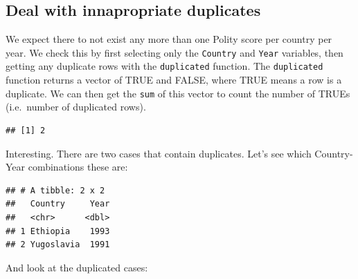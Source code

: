 \documentclass[]{book}
\newenvironment{Shaded}{\begin{snugshade}}{\end{snugshade}}
\newcommand{\DecValTok}[1]{\textcolor[rgb]{0.00,0.00,0.81}{#1}}
\newcommand{\KeywordTok}[1]{\textcolor[rgb]{0.13,0.29,0.53}{\textbf{#1}}}
\newcommand{\NormalTok}[1]{#1}
\newcommand{\OperatorTok}[1]{\textcolor[rgb]{0.81,0.36,0.00}{\textbf{#1}}}
\newcommand{\StringTok}[1]{\textcolor[rgb]{0.31,0.60,0.02}{#1}}
\begin{document}
\hypertarget{deal-with-innapropriate-duplicates}{%
\subsection{Deal with innapropriate duplicates}\label{deal-with-innapropriate-duplicates}}

We expect there to not exist any more than one Polity score per country per year. We check this by first selecting only the \texttt{Country} and \texttt{Year} variables, then getting any duplicate rows with the \texttt{duplicated} function. The \texttt{duplicated} function returns a vector of TRUE and FALSE, where TRUE means a row is a duplicate. We can then get the \texttt{sum} of this vector to count the number of TRUEs (i.e.~number of duplicated rows).

\begin{Shaded}
\end{Shaded}

\begin{verbatim}
## [1] 2
\end{verbatim}

Interesting. There are two cases that contain duplicates. Let's see which Country-Year combinations these are:

\begin{Shaded}
\end{Shaded}

\begin{verbatim}
## # A tibble: 2 x 2
##   Country     Year
##   <chr>      <dbl>
## 1 Ethiopia    1993
## 2 Yugoslavia  1991
\end{verbatim}

And look at the duplicated cases:

\begin{Shaded}
\end{Shaded}
\end{document}
